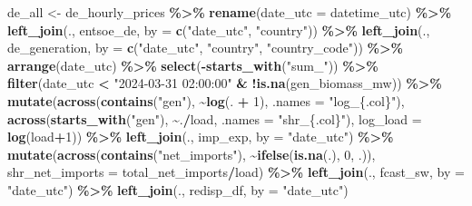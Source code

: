 \documentclass[
]{article}
\newenvironment{Shaded}{\begin{snugshade}}{\end{snugshade}}
\newcommand{\AttributeTok}[1]{\textcolor[rgb]{0.13,0.29,0.53}{#1}}
\newcommand{\DecValTok}[1]{\textcolor[rgb]{0.00,0.00,0.81}{#1}}
\newcommand{\FunctionTok}[1]{\textcolor[rgb]{0.13,0.29,0.53}{\textbf{#1}}}
\newcommand{\NormalTok}[1]{#1}
\newcommand{\OtherTok}[1]{\textcolor[rgb]{0.56,0.35,0.01}{#1}}
\newcommand{\SpecialCharTok}[1]{\textcolor[rgb]{0.81,0.36,0.00}{\textbf{#1}}}
\newcommand{\StringTok}[1]{\textcolor[rgb]{0.31,0.60,0.02}{#1}}
\begin{document}
\begin{Shaded}
\begin{Highlighting}[]
\NormalTok{de\_all }\OtherTok{\textless{}{-}}\NormalTok{ de\_hourly\_prices }\SpecialCharTok{\%\textgreater{}\%} 
  \FunctionTok{rename}\NormalTok{(}\AttributeTok{date\_utc =}\NormalTok{ datetime\_utc) }\SpecialCharTok{\%\textgreater{}\%} 
  \FunctionTok{left\_join}\NormalTok{(., entsoe\_de, }\AttributeTok{by =} \FunctionTok{c}\NormalTok{(}\StringTok{"date\_utc"}\NormalTok{, }\StringTok{"country"}\NormalTok{)) }\SpecialCharTok{\%\textgreater{}\%} 
  \FunctionTok{left\_join}\NormalTok{(., de\_generation, }\AttributeTok{by =} \FunctionTok{c}\NormalTok{(}\StringTok{"date\_utc"}\NormalTok{, }\StringTok{"country"}\NormalTok{, }\StringTok{"country\_code"}\NormalTok{)) }\SpecialCharTok{\%\textgreater{}\%} 
  \FunctionTok{arrange}\NormalTok{(date\_utc) }\SpecialCharTok{\%\textgreater{}\%} 
  \FunctionTok{select}\NormalTok{(}\SpecialCharTok{{-}}\FunctionTok{starts\_with}\NormalTok{(}\StringTok{"sum\_"}\NormalTok{)) }\SpecialCharTok{\%\textgreater{}\%} 
  \FunctionTok{filter}\NormalTok{(date\_utc }\SpecialCharTok{\textless{}} \StringTok{"2024{-}03{-}31 02:00:00"} \SpecialCharTok{\&} \SpecialCharTok{!}\FunctionTok{is.na}\NormalTok{(gen\_biomass\_mw)) }\SpecialCharTok{\%\textgreater{}\%} 
  \FunctionTok{mutate}\NormalTok{(}\FunctionTok{across}\NormalTok{(}\FunctionTok{contains}\NormalTok{(}\StringTok{"gen"}\NormalTok{), }\SpecialCharTok{\textasciitilde{}}\FunctionTok{log}\NormalTok{(. }\SpecialCharTok{+} \DecValTok{1}\NormalTok{), }\AttributeTok{.names =} \StringTok{"log\_\{.col\}"}\NormalTok{),}
         \FunctionTok{across}\NormalTok{(}\FunctionTok{starts\_with}\NormalTok{(}\StringTok{"gen"}\NormalTok{), }\SpecialCharTok{\textasciitilde{}}\NormalTok{.}\SpecialCharTok{/}\NormalTok{load, }\AttributeTok{.names =} \StringTok{"shr\_\{.col\}"}\NormalTok{),}
         \AttributeTok{log\_load =} \FunctionTok{log}\NormalTok{(load}\SpecialCharTok{+}\DecValTok{1}\NormalTok{)) }\SpecialCharTok{\%\textgreater{}\%} 
  \FunctionTok{left\_join}\NormalTok{(., imp\_exp, }\AttributeTok{by =} \StringTok{"date\_utc"}\NormalTok{) }\SpecialCharTok{\%\textgreater{}\%} 
  \FunctionTok{mutate}\NormalTok{(}\FunctionTok{across}\NormalTok{(}\FunctionTok{contains}\NormalTok{(}\StringTok{"net\_imports"}\NormalTok{), }\SpecialCharTok{\textasciitilde{}}\FunctionTok{ifelse}\NormalTok{(}\FunctionTok{is.na}\NormalTok{(.), }\DecValTok{0}\NormalTok{, .)),}
         \AttributeTok{shr\_net\_imports =}\NormalTok{ total\_net\_imports}\SpecialCharTok{/}\NormalTok{load) }\SpecialCharTok{\%\textgreater{}\%} 
  \FunctionTok{left\_join}\NormalTok{(., fcast\_sw, }\AttributeTok{by =} \StringTok{"date\_utc"}\NormalTok{) }\SpecialCharTok{\%\textgreater{}\%} 
  \FunctionTok{left\_join}\NormalTok{(., redisp\_df, }\AttributeTok{by =} \StringTok{"date\_utc"}\NormalTok{)}


\end{Highlighting}
\end{Shaded}
\end{document}
